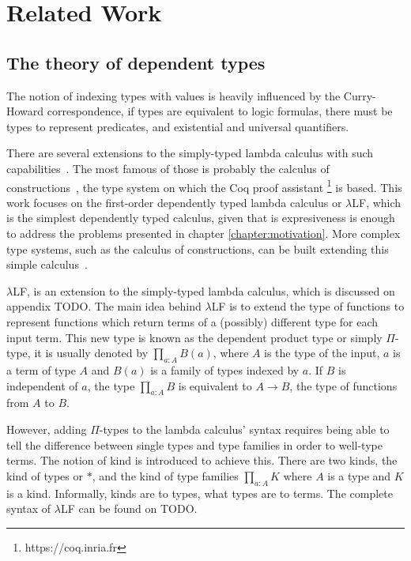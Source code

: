 \chapter{Related Work}

\label{chapter:related_work}

\section{The theory of dependent types} 

The notion of indexing types with values is heavily influenced by the
Curry-Howard correspondence, if types are equivalent to logic formulas, there
must be types to represent predicates, and existential and universal
quantifiers.

There are several extensions to the simply-typed lambda calculus with such
capabilities~\cite{pierce}. The most famous of those is probably the calculus of
constructions~\cite{coc}, the type system on which the Coq proof assistant
\footnote{https://coq.inria.fr} is based. This work focuses on the first-order
dependently typed lambda calculus or $\lambda$LF, which is the simplest
dependently typed calculus, given that is expresiveness is enough to address the
problems presented in chapter \ref{chapter:motivation}. More complex type
systems, such as the calculus of constructions, can be built extending this
simple calculus~\cite{pierce}.

$\lambda$LF, is an extension to the simply-typed lambda calculus, which is
discussed on appendix TODO. The main idea behind $\lambda$LF is to extend the
type of functions to represent functions which return terms of a (possibly)
different type for each input term. This new type is known as the dependent
product type or simply $\Pi$-type, it is usually denoted by $\prod_{a:A} B(a)$,
where $A$ is the type of the input, $a$ is a term of type $A$ and $B(a)$ is a
family of types indexed by $a$. If $B$ is independent of $a$, the type
$\prod_{a:A} B$ is equivalent to $A \rightarrow B$, the type of functions from
$A$ to $B$.

However, adding $\Pi$-types to the lambda calculus' syntax requires being able
to tell the difference between single types and type families in order to
well-type terms. The notion of kind is introduced to achieve this. There are two
kinds, the kind of types or $*$, and the kind of type families $\prod_{a:A}K$
where $A$ is a type and $K$ is a kind. Informally, kinds are to types, what
types are to terms. The complete syntax of $\lambda$LF can be found on TODO.

